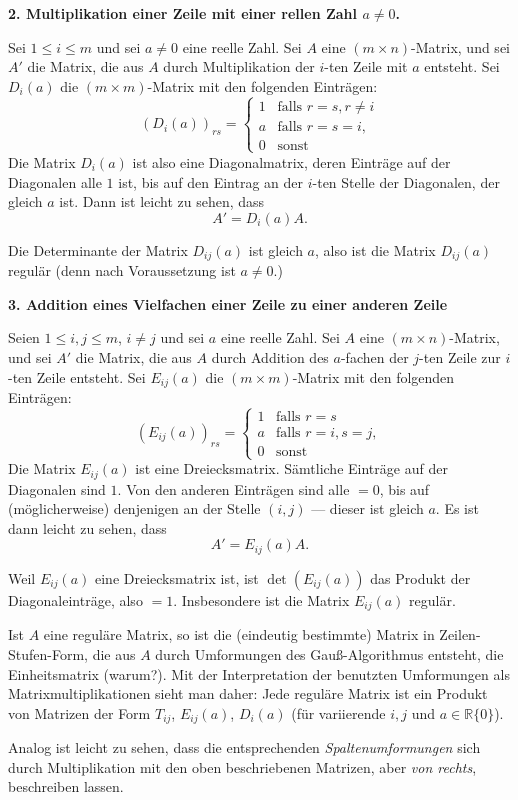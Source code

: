 \documentclass{ximera}
\begin{document}
\bigskip
\textbf{2. Multiplikation einer Zeile mit einer rellen Zahl $a\ne 0$.}

Sei $1\le i \le m$ und sei $a\ne 0$ eine reelle Zahl. Sei $A$ eine $(m\times n)$-Matrix, und sei $A'$ die Matrix, die aus $A$ durch Multiplikation der $i$-ten Zeile mit $a$ entsteht. Sei $D_{i}(a)$ die $(m\times m)$-Matrix mit den folgenden Einträgen:
\[
(D_{i}(a))_{rs} = \left\{
\begin{array}{ll}
1 & \text{falls } r=s, r\ne i\\
a & \text{falls } r = s=i,\\
0 & \text{sonst}
\end{array}
\right.
\]
Die Matrix $D_{i}(a)$ ist also eine Diagonalmatrix, deren Einträge auf der Diagonalen alle $1$ ist, bis auf den Eintrag an der $i$-ten Stelle der Diagonalen, der gleich $a$ ist.
Dann ist leicht zu sehen, dass
\[
A' = D_{i}(a) A.
\]

Die Determinante der Matrix $D_{ij}(a)$ ist gleich $a$, also ist die Matrix $D_{ij}(a)$ regulär (denn nach Voraussetzung ist $a\ne0$.)


\bigskip
\textbf{3. Addition eines Vielfachen einer Zeile zu einer anderen Zeile}

Seien $1\le i,j \le m$, $i\ne j$ und sei $a$ eine reelle Zahl. Sei $A$ eine $(m\times n)$-Matrix, und sei $A'$ die Matrix, die aus $A$ durch Addition des $a$-fachen der $j$-ten Zeile zur $i$-ten Zeile entsteht. Sei $E_{ij}(a)$ die $(m\times m)$-Matrix mit den folgenden Einträgen:
\[
(E_{ij}(a))_{rs} = \left\{
\begin{array}{ll}
1 & \text{falls } r=s\\
a & \text{falls } r =i, s=j,\\
0 & \text{sonst}
\end{array}
\right.
\]
Die Matrix $E_{ij}(a)$ ist eine Dreiecksmatrix. Sämtliche Einträge auf der Diagonalen sind $1$. Von den anderen Einträgen sind alle $=0$, bis auf (möglicherweise) denjenigen an der Stelle $(i,j)$ --- dieser ist gleich $a$.
Es ist dann leicht zu sehen, dass
\[
A' = E_{ij}(a) A.
\]

Weil $E_{ij}(a)$ eine Dreiecksmatrix ist, ist $\det(E_{ij}(a))$ das Produkt der Diagonaleinträge, also $=1$. Insbesondere ist die Matrix $E_{ij}(a)$ regulär.


\bigskip
Ist $A$ eine reguläre Matrix, so ist die (eindeutig bestimmte) Matrix in Zeilen-Stufen-Form, die aus $A$ durch Umformungen des Gauß-Algorithmus entsteht, die Einheitsmatrix (warum?). Mit der Interpretation der benutzten Umformungen als Matrixmultiplikationen sieht man daher: Jede reguläre Matrix ist ein Produkt von Matrizen der Form $T_{ij}$, $E_{ij}(a)$, $D_i(a)$ (für variierende $i,j$ und $a\in\mathbb R\{0\}$).

\bigskip
Analog ist leicht zu sehen, dass die entsprechenden \emph{Spaltenumformungen} sich durch Multiplikation mit den oben beschriebenen Matrizen, aber \emph{von rechts}, beschreiben lassen.
\end{document}

